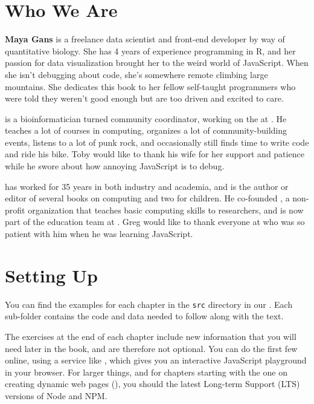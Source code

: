 \section{Who We Are}\label{s:intro-contributors}

\textbf{Maya Gans} is a freelance data scientist and front-end developer by way of quantitative biology. 
She has 4 years of experience programming in R, 
and her passion for data visualization brought her to the weird world of JavaScript. 
When she isn't debugging  about code, 
she's somewhere remote climbing large mountains. 
She dedicates this book to her fellow self-taught programmers who were told they weren't good enough
but are too driven and excited to care.

\textbf{} is a bioinformatician turned community
coordinator, working on the  at
. He teaches a lot of courses in computing, organizes
a lot of community-building events, listens to a lot of punk rock, and
occasionally still finds time to write code and ride his bike. Toby would like
to thank his wife for her support and patience while he swore about how annoying
JavaScript is to debug.

\textbf{} has worked for 35 years in both industry and
academia, and is the author or editor of several books on computing and two for
children. He co-founded , a non-profit
organization that teaches basic computing skills to researchers, and is now part
of the education team at . Greg would like to
thank everyone at  who was so patient with him when
he was learning JavaScript.

\section{Setting Up}\label{s:intro-setup}

You can find the examples for each chapter in the \texttt{src} directory
in our .
Each sub-folder contains the code and data needed to follow along with the text.

The exercises at the end of each chapter include new information
that you will need later in the book,
and are therefore not optional.
You can do the first few online,
using a service like ,
which gives you an interactive JavaScript playground in your browser.
For larger things,
and for chapters starting with the one on creating dynamic web pages (),
you should  the latest Long-term Support (LTS) versions of Node and NPM.

